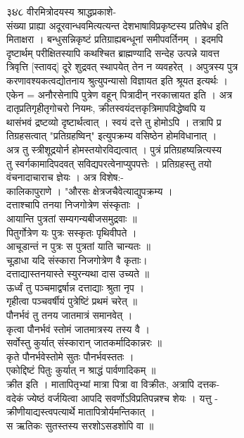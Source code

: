 \documentclass[11pt, openany]{book}
\begin{document}
{{{{{{{{{{{{{{{{{{{{{{{{{{{{{{{{{{{{{{{{{{{{{{{{{{{{{{{{{{{{{{{{{{{{{{{{३૪૮ वीरमित्रोदयस्य श्राद्धप्रकाशे-\\
संख्या प्राह्या अदूरवान्धवमित्यत्यन्त देशभाषाविप्रकृष्टस्य प्रतिषेध
इति\\
मिताक्षरा । बन्धुसन्निकृष्टं प्रतिग्राह्यबन्धूनां समीपवर्तिनम् । इदमपि\\
दृष्टार्थम् \textbar{} परीक्षितस्यापि कथश्चित ब्राह्मण्यादि सन्देह
उत्पन्ने यावत्त\\
त्रिवृत्ति [स्तावद्] दूरे शुद्रवत् स्थापयेत् तेन न व्यवहरेत् ।
अपुत्रस्य पुत्र\\
करणावश्यकत्वद्योतनाय श्रुत्युपन्यासो विज्ञायत इति श्रूयत इत्यर्थः ।\\
एकेन = अनौरसेनापि पुत्रेण वहून् पित्रादीन् नरकात्त्रायत इति । अत्र\\
दातृप्रतिगृहीतृगोचरो नियमः, क्रीतस्वयंदत्तकृत्रिमापविद्धेष्वपि य\\
थासंभवं द्रष्टव्यो दृष्टार्थत्वात् । स्वयं दत्ते तु होमोऽपि । तत्रापि
प्र\\
तिग्रहसत्वात् "प्रतिग्रहष्विन्" इत्युपक्रम्य वसिष्ठेन होमविधानात् ।\\
अत्र तु स्त्रीशूद्रयोर्न होमस्तयोरविद्यत्वात् । पुत्रं
प्रतिग्रहष्यन्नित्यस्य\\
तु स्वर्गकामादिपदवत् सविद्यपरत्वेनाप्युपपत्तेः । प्रतिग्रहस्तु तयो\\
वंचनादाचाराच ज्ञेयः । अत्र विशेष:-\\
कालिकापुराणे । "औरसः क्षेत्रजचैवेत्याद्युपक्रम्य ।\\
दत्ताश्चापि तनया निजगोत्रेण संस्कृताः ।\\
आयान्ति पुत्रतां सम्यगन्यबीजसमुद्रवाः ॥\\
पितुर्गोत्रेण यः पुत्रः सस्कृतः पृथिवीपते ।\\
आचूडान्तं न पुत्रः स पुत्रतां याति चान्यतः ॥\\
चूड़ाधा यदि संस्कारा निजगोत्रेण वै कृताः।\\
दत्ताद्यास्तनयास्ते स्युरन्यथा दास उच्यते ॥\\
ऊर्ध्वं तु पञ्चमाद्वर्षान्न दत्ताद्याः श्रुता नृप ।\\
गृहीत्वा पञ्चवर्षीयं पुत्रेष्टिं प्रथमं चरेत् ॥\\
पौनर्भवं तु तनय जातमात्रं समानवेत् ।\\
कृत्वा पौनर्भवं स्तोमं जातमात्रस्य तस्य वै ।\\
सर्वोस्तु कुर्यात् संस्कारान् जातकर्मादिकान्नरः ॥\\
कृते पौनर्भवेस्तोमे सुतः पौनर्भवस्ततः ।\\
एकोद्दिष्टं पितुः कुर्यात् न श्राद्धं पार्वणादिकम् ॥\\
क्रीत इति । मातापितृभ्यां मात्रा पित्रा वा विक्रीतः, अत्रापि दत्तक-\\
वदेकं ज्येष्ठं वर्जयित्वा आपदि सवर्णोऽविप्रतिपन्नश्च शेयः । यत्तु -\\
क्रीणीयाद्यस्त्वपत्यार्थे मातापित्रोर्यमन्तिकात् ।\\
स ऋतिकः सुतस्तस्य सरशोऽसडशोपि वा ॥\\
[ अ० ९ श्लो० १७४ ]

}}}}}}}}}}}}}}}}}}}}}}}}}}}}}}}}}}}}}}}}}}}}}}}}}}}}}}}}}}}}}}}}}}}}}}}}
\end{document}
